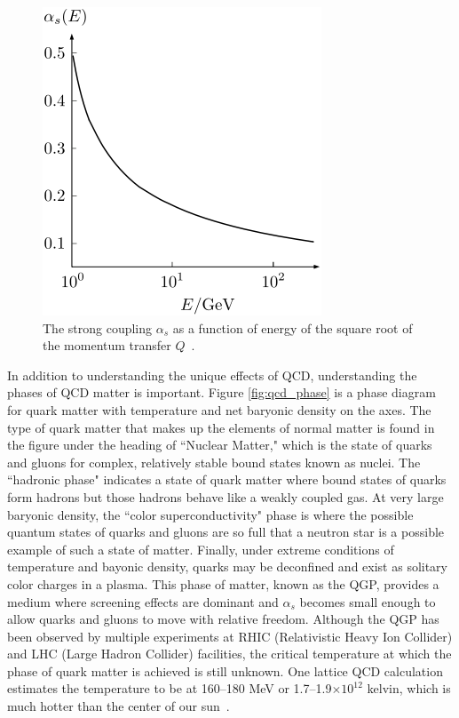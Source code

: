 \begin{figure}[!ht]
\centering
\includegraphics[width=0.45\linewidth]{figs/coupling_constant.png}
\caption{The strong coupling $\alpha_s$ as a function of energy of the square root of the momentum transfer $Q$~\cite{Bethke2009}.}
\label{fig:coupling_plot_ch1}
\end{figure}

In addition to understanding the unique effects of QCD, understanding the phases of QCD matter is important. Figure \ref{fig:qcd_phase} is a phase diagram for quark matter with temperature  and net baryonic density on the axes. The type of quark matter that makes up the elements of normal matter is found in the figure under the heading of ``Nuclear Matter," which is the state of quarks and gluons for complex, relatively stable bound states known as nuclei. The ``hadronic phase" indicates a state of quark matter where bound states of quarks form hadrons but those hadrons behave like a weakly coupled gas. At very large baryonic density, the ``color superconductivity" phase is where the possible quantum states of quarks and gluons are so full that a neutron star is a possible example of such a state of matter. Finally, under extreme conditions of temperature and bayonic density, quarks may be deconfined and exist as solitary color charges in a plasma. This phase of matter, known as the QGP, provides a medium where screening effects are dominant and $\alpha_s$ becomes small enough to allow quarks and gluons to move with relative freedom. Although the QGP has been observed by multiple experiments at RHIC (Relativistic Heavy Ion Collider) and LHC (Large Hadron Collider) facilities, the critical temperature at which the phase of quark matter is achieved is still unknown. One lattice QCD calculation estimates the temperature to be at 160--180 MeV or 1.7--1.9$\times10^{12}$ kelvin, which is much hotter than the center of our sun~\cite{SATZ20114}.

